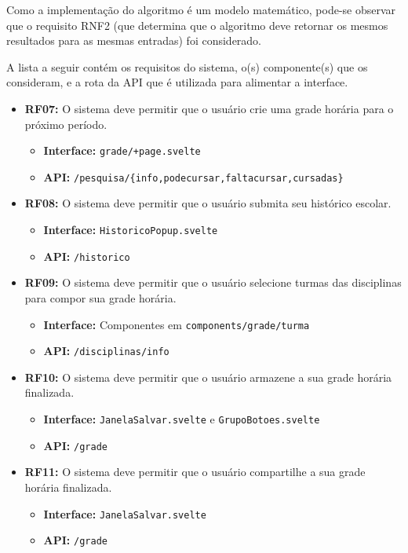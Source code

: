 Como a implementação do algoritmo é um modelo matemático, pode-se observar que o requisito RNF2 (que determina que o algoritmo deve retornar os mesmos resultados para as mesmas entradas) foi considerado. 

A lista a seguir contém os requisitos do sistema, o(s) componente(s) que os consideram, e a rota da API que é utilizada para alimentar a interface.

\begin{itemize}
    \item \textbf{RF07:} O sistema deve permitir que o usuário crie uma grade horária para o próximo período.
    \begin{itemize}
        \item \textbf{Interface:} \verb|grade/+page.svelte|
        \item \textbf{API:} \verb|/pesquisa/{info,podecursar,faltacursar,cursadas}|
    \end{itemize}
    
    \item \textbf{RF08:} O sistema deve permitir que o usuário submita seu histórico escolar.
    \begin{itemize}
        \item \textbf{Interface:} \verb|HistoricoPopup.svelte|
        \item \textbf{API:} \verb|/historico|
    \end{itemize}

    \item \textbf{RF09:} O sistema deve permitir que o usuário selecione turmas das disciplinas para compor sua grade horária.
    \begin{itemize}
        \item \textbf{Interface:} Componentes em \verb|components/grade/turma|
        \item \textbf{API:} \verb|/disciplinas/info|
    \end{itemize}

    \item \textbf{RF10:} O sistema deve permitir que o usuário armazene a sua grade horária finalizada.
    \begin{itemize}
        \item \textbf{Interface:} \verb|JanelaSalvar.svelte| e \verb|GrupoBotoes.svelte|
        \item \textbf{API:} \verb|/grade|
    \end{itemize}

    \item \textbf{RF11:} O sistema deve permitir que o usuário compartilhe a sua grade horária finalizada.
    \begin{itemize}
        \item \textbf{Interface:} \verb|JanelaSalvar.svelte|
        \item \textbf{API:} \verb|/grade|
    \end{itemize}


\end{itemize}
